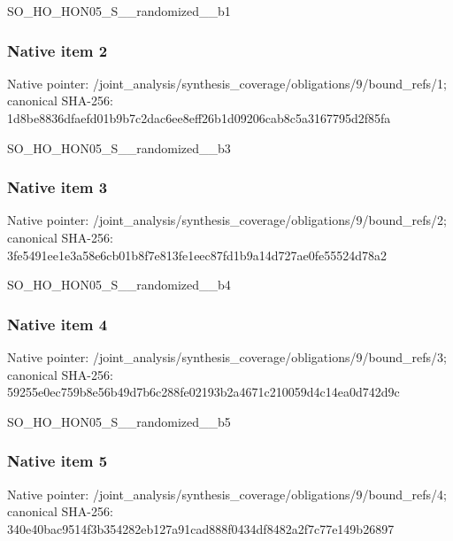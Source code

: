 \documentclass[10pt,a4paper]{article}
\begin{document}
\begingroup\raggedright\sloppy SO\_\allowbreak{}HO\_\allowbreak{}HON05\_\allowbreak{}S\_\allowbreak{}\_\allowbreak{}randomized\_\allowbreak{}\_\allowbreak{}b1\par\endgroup

\subsubsection{Native item 2}
Native pointer: /joint\_\allowbreak{}analysis/synthesis\_\allowbreak{}coverage/obligations/9/bound\_\allowbreak{}refs/1; canonical SHA-256: 1d8be8836dfaefd01b9b7c2dac6ee8eff26b1d09206cab8c5a3167795d2f85fa

\begingroup\raggedright\sloppy SO\_\allowbreak{}HO\_\allowbreak{}HON05\_\allowbreak{}S\_\allowbreak{}\_\allowbreak{}randomized\_\allowbreak{}\_\allowbreak{}b3\par\endgroup

\subsubsection{Native item 3}
Native pointer: /joint\_\allowbreak{}analysis/synthesis\_\allowbreak{}coverage/obligations/9/bound\_\allowbreak{}refs/2; canonical SHA-256: 3fe5491ee1e3a58e6cb01b8f7e813fe1eec87fd1b9a14d727ae0fe55524d78a2

\begingroup\raggedright\sloppy SO\_\allowbreak{}HO\_\allowbreak{}HON05\_\allowbreak{}S\_\allowbreak{}\_\allowbreak{}randomized\_\allowbreak{}\_\allowbreak{}b4\par\endgroup

\subsubsection{Native item 4}
Native pointer: /joint\_\allowbreak{}analysis/synthesis\_\allowbreak{}coverage/obligations/9/bound\_\allowbreak{}refs/3; canonical SHA-256: 59255e0ec759b8e56b49d7b6c288fe02193b2a4671c210059d4c14ea0d742d9c

\begingroup\raggedright\sloppy SO\_\allowbreak{}HO\_\allowbreak{}HON05\_\allowbreak{}S\_\allowbreak{}\_\allowbreak{}randomized\_\allowbreak{}\_\allowbreak{}b5\par\endgroup

\subsubsection{Native item 5}
Native pointer: /joint\_\allowbreak{}analysis/synthesis\_\allowbreak{}coverage/obligations/9/bound\_\allowbreak{}refs/4; canonical SHA-256: 340e40bac9514f3b354282eb127a91cad888f0434df8482a2f7c77e149b26897
\end{document}

